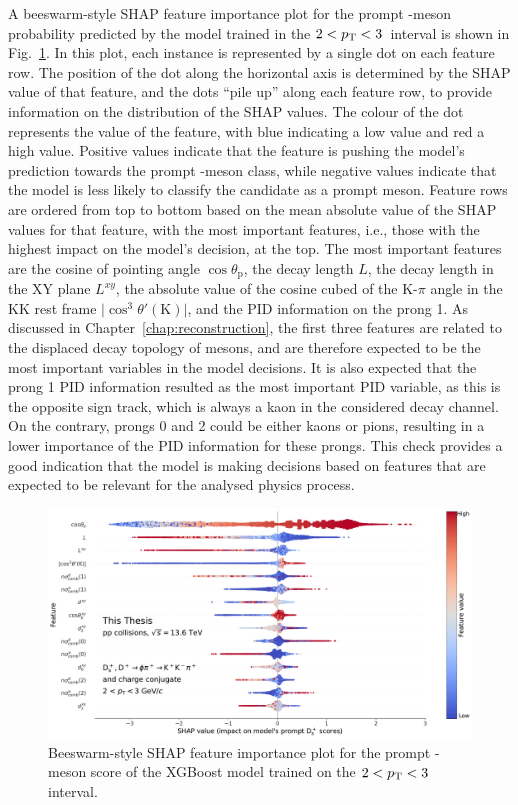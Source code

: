 A beeswarm-style SHAP feature importance plot for the prompt \ds-meson probability predicted by the model trained in the $2<p_\mathrm{T}<3$~\gevc interval is shown in Fig.~\ref{fig:ml_feature_importance}. In this plot, each instance is represented by a single dot on each feature row. The position of the dot along the horizontal axis is determined by the SHAP value of that feature, and the dots ``pile up'' along each feature row, to provide information on the distribution of the SHAP values. The colour of the dot represents the value of the feature, with blue indicating a low value and red a high value. Positive values indicate that the feature is pushing the model's prediction towards the prompt \ds-meson class, while negative values indicate that the model is less likely to classify the candidate as a prompt \ds meson. Feature rows are ordered from top to bottom based on the mean absolute value of the SHAP values for that feature, with the most important features, i.e., those with the highest impact on the model's decision, at the top. The most important features are the cosine of pointing angle $\cos\theta_\mathrm{p}$, the decay length $L$, the decay length in the XY plane $L^{xy}$, the absolute value of the cosine cubed of the K-$\pi$ angle in the KK rest frame $\lvert\cos^3\theta'(\mathrm{K})\rvert$, and the PID information on the prong 1. As discussed in Chapter~\ref{chap:reconstruction}, the first three features are related to the displaced decay topology of \ds mesons, and are therefore expected to be the most important variables in the model decisions. It is also expected that the prong 1 PID information resulted as the most important PID variable, as this is the opposite sign track, which is always a kaon in the considered decay channel. On the contrary, prongs 0 and 2 could be either kaons or pions, resulting in a lower importance of the PID information for these prongs. This check provides a good indication that the model is making decisions based on features that are expected to be relevant for the analysed physics process. 

\begin{figure}[htb]
    \centering
    \includegraphics[width=\textwidth]{Figures/Chapter 5/shap.pdf}
    \caption{Beeswarm-style SHAP feature importance plot for the prompt \ds-meson score of the XGBoost model trained on the \mbox{$2<p_\mathrm{T}<3$~\gevc} interval.}
    \label{fig:ml_feature_importance}
\end{figure}

